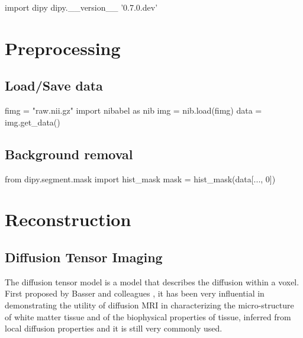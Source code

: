 \documentclass{bioinfo}
\begin{document}
\begin{python}
import dipy
dipy.__version__
'0.7.0.dev'
\end{python}

\section{Preprocessing}

\subsection{Load/Save data}

\begin{python}
fimg = "raw.nii.gz"
import nibabel as nib
img = nib.load(fimg)
data = img.get_data()
\end{python}

\subsection{Background removal}

\begin{python}
from dipy.segment.mask import hist_mask
mask = hist_mask(data[..., 0])
\end{python}

\section{Reconstruction}

\subsection{Diffusion Tensor Imaging}

The diffusion tensor model is a model that describes the diffusion within a
voxel. First proposed by Basser and colleagues \citep{basser-mattiello-etal:94}, it has been very
influential in demonstrating the utility of diffusion MRI in characterizing the
micro-structure of white matter tissue and of the biophysical properties of
tissue, inferred from local diffusion properties and it is still very commonly
used.
\end{document}
